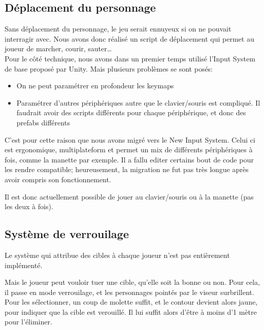 \documentclass[french, 12pt]{article}
\begin{document}
        \subsection{Déplacement du personnage}
        
            Sans déplacement du personnage, le jeu serait ennuyeux si on ne pouvait interragir avec.
            Nous avons donc réalisé un script de déplacement qui permet au joueur de marcher, courir, sauter\dots\\

            Pour le côté technique, nous avons dans un premier temps utilisé l'Input System de base proposé par Unity. Mais plusieurs problèmes se sont posés:
            \begin{itemize}
                \item On ne peut paramétrer en profondeur les keymaps
                \item Paramétrer d'autres périphériques autre que le clavier/souris est compliqué. Il faudrait avoir des scripts différents pour chaque périphérique, et donc des prefabs différents
            \end{itemize}
            C'est pour cette raison que nous avons migré vers le New Input System.
            Celui ci est ergonomique, multiplateform et permet un mix de différents périphériques à fois, comme la manette par exemple.
            Il a fallu editer certains bout de code pour les rendre compatible; heureusement, la migration ne fut pas très longue après avoir compris son fonctionnement.

            Il est donc actuellement possible de jouer au clavier/souris ou à la manette (pas les deux à fois).
        
        \subsection{Système de verrouilage}

            Le système qui attribue des cibles à chaque joueur n'est pas entièrement implémenté.
            
            Mais le joueur peut vouloir tuer une cible, qu'elle soit la bonne ou non.
            Pour cela, il passe en mode verrouilage, et les personnages pointés par le viseur surbrillent.
            Pour les sélectionner, un coup de molette suffit, et le contour devient alors jaune, pour indiquer que la cible est verouillé.
            Il lui suffit alors d'être à moins d'1 mètre pour l'éliminer.
\end{document}
